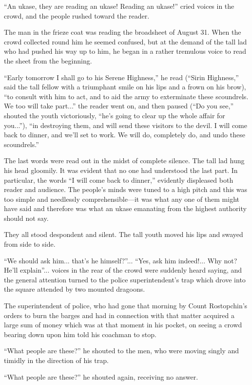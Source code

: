 ``An ukase, they are reading an ukase! Reading an ukase!'' cried
voices in the crowd, and the people rushed toward the reader.

The man in the frieze coat was reading the broadsheet of August
31. When the crowd collected round him he seemed confused, but at
the demand of the tall lad who had pushed his way up to him, he
began in a rather tremulous voice to read the sheet from the
beginning.

``Early tomorrow I shall go to his Serene Highness,'' he read
(``Sirin Highness,'' said the tall fellow with a triumphant smile
on his lips and a frown on his brow), ``to consult with him to
act, and to aid the army to exterminate these scoundrels. We too
will take part...'' the reader went on, and then paused (``Do you
see,'' shouted the youth victoriously, ``he's going to clear up
the whole affair for you...''), ``in destroying them, and will
send these visitors to the devil. I will come back to dinner, and
we'll set to work. We will do, completely do, and undo these
scoundrels.''

The last words were read out in the midst of complete
silence. The tall lad hung his head gloomily. It was evident that
no one had understood the last part. In particular, the words ``I
will come back to dinner,'' evidently displeased both reader and
audience. The people's minds were tuned to a high pitch and this
was too simple and needlessly comprehensible---it was what any
one of them might have said and therefore was what an ukase
emanating from the highest authority should not say.

They all stood despondent and silent. The tall youth moved his
lips and swayed from side to side.

``We should ask him... that's he himself?''... ``Yes, ask him
indeed!...  Why not? He'll explain''... voices in the rear of the
crowd were suddenly heard saying, and the general attention
turned to the police superintendent's trap which drove into the
square attended by two mounted dragoons.

The superintendent of police, who had gone that morning by Count
Rostopchin's orders to burn the barges and had in connection with
that matter acquired a large sum of money which was at that
moment in his pocket, on seeing a crowd bearing down upon him
told his coachman to stop.

``What people are these?'' he shouted to the men, who were moving
singly and timidly in the direction of his trap.

``What people are these?'' he shouted again, receiving no answer.

